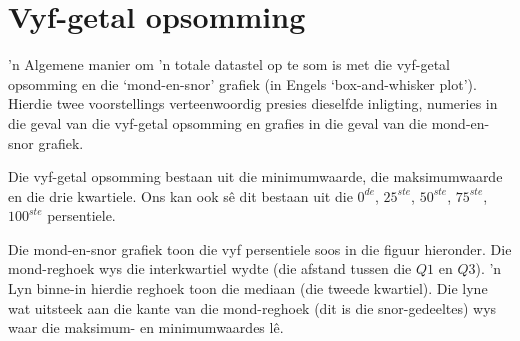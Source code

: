 \section{Vyf-getal opsomming}
’n Algemene manier om ’n totale datastel op te som is met die vyf-getal opsomming en die ‘mond-en-snor’ grafiek (in Engels ‘box-and-whisker plot’). Hierdie twee voorstellings verteenwoordig presies dieselfde inligting, numeries in die geval van die vyf-getal opsomming en grafies in die geval van die mond-en-snor grafiek.

\par
Die vyf-getal opsomming bestaan uit die minimumwaarde, die maksimumwaarde en die drie kwartiele. Ons kan ook sê dit bestaan uit die $0^{de}$,
$25^{ste}$, $50^{ste}$, $75^{ste}$, $100^{ste}$ persentiele.

Die mond-en-snor grafiek toon die vyf persentiele soos in die figuur hieronder. Die mond-reghoek wys die interkwartiel wydte (die afstand tussen die  $Q1$ en $Q3$). ’n Lyn binne-in hierdie reghoek toon die mediaan (die tweede kwartiel). Die lyne wat uitsteek aan die kante van die mond-reghoek (dit is die snor-gedeeltes) wys waar die maksimum- en minimumwaardes lê. 
\par
{}
\clearpage
\begin{figure}[t]
  \begin{center}
  \end{center}
\end{figure}
\vspace{1cm}

